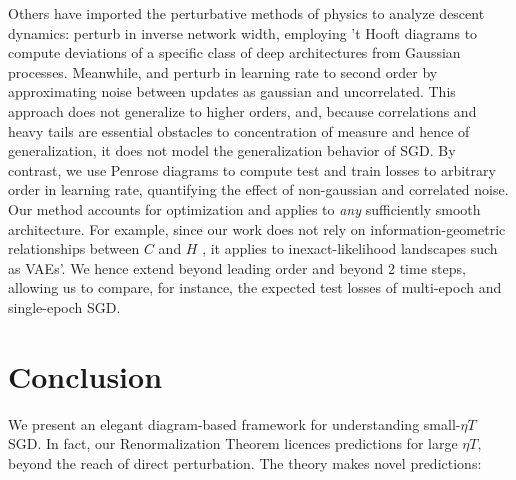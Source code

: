 \documentclass{article}
\theoremstyle{plain}
\theoremstyle{definition}
\begin{document}

    Others have imported the perturbative methods of physics to analyze descent
    dynamics:  \citet{dy19} perturb in inverse network width, employing 't
    Hooft diagrams to compute deviations of a specific class of deep
    architectures from Gaussian processes.  Meanwhile, \cite{ch18} and
    \citet{li17} perturb in learning rate to second order by approximating
    noise between updates as gaussian and uncorrelated.  This approach does not
    generalize to higher orders, and, because correlations and heavy tails are
    essential obstacles to concentration of measure and hence of
    generalization, it does not model the generalization behavior of SGD.  By
    contrast, we use Penrose diagrams to compute test and train losses to
    arbitrary order in learning rate, quantifying the effect of non-gaussian
    and correlated noise.  Our method accounts for optimization and applies to
    \emph{any} sufficiently smooth architecture.  For example, since our work
    does not rely on information-geometric relationships between $C$ and $H$
    \citep{am98}, it applies to inexact-likelihood landscapes such as VAEs'.
    We hence extend \citet{ro18} beyond leading order and beyond $2$ time
    steps, allowing us to compare, for instance, the expected test losses of
    multi-epoch and single-epoch SGD.


\section{Conclusion} \label{sect:concl}


    We present an elegant diagram-based framework for understanding small-$\eta
    T$ SGD.
        In fact, our Renormalization Theorem licences
    predictions for large $\eta T$, beyond the reach of direct perturbation.
    The theory makes novel predictions:
\end{document}
